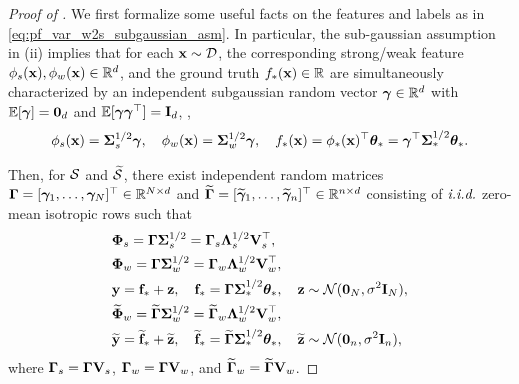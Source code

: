 \begin{proof}[Proof of ]
    We first formalize some useful facts on the features and labels as in \eqref{eq:pf_var_w2s_subgaussian_asm}.
    In particular, the sub-gaussian assumption in (ii) implies that for each $\xb \sim \Dcal$, the corresponding strong/weak feature $\phi_s(\xb), \phi_w(\xb) \in \R^d$, and the ground truth $f_*(\xb) \in \R$ are simultaneously characterized by an independent subgaussian random vector $\gammab \in \R^d$ with $\E[\gammab] = \b0_{d}$ and $\E[\gammab \gammab^\top] = \Ib_{d}$, \ie,
    \begin{align*}
        \phi_s(\xb) = \Sigmab_s^{1/2} \gammab, \quad \phi_w(\xb) = \Sigmab_w^{1/2} \gammab, \quad f_*(\xb) = \phi_*(\xb)^\top \thetab_* = \gammab^\top \Sigmab_*^{1/2} \thetab_*.
    \end{align*}

    Then, for $\Scal$ and $\wt\Scal$, there exist independent random matrices $\Gammab = [\gammab_1, \ldots, \gammab_N]^\top \in \R^{N \times d}$ and $\wt\Gammab = [\wt\gammab_1, \ldots, \wt\gammab_n]^\top \in \R^{n \times d}$ consisting of $\iid$ zero-mean isotropic rows such that
    \begin{align}\label{eq:pf_var_w2s_subgaussian_asm_2}
    \begin{split}
        &\Phib_s = \Gammab \Sigmab_s^{1/2} = \Gammab_s \Lambdab_s^{1/2} \Vb_s^\top, \\
        &\Phib_w = \Gammab \Sigmab_w^{1/2} = \Gammab_w \Lambdab_w^{1/2} \Vb_w^\top, \\
        &\yb = \fb_* + \zb, \quad \fb_* = \Gammab \Sigmab_*^{1/2} \thetab_*, \quad \zb \sim \Ncal(\b0_N, \sigma^2 \Ib_N), \\
        &\wt\Phib_w = \wt\Gammab \Sigmab_w^{1/2} = \wt\Gammab_w \Lambdab_w^{1/2} \Vb_w^\top, \\
        &\wt\yb = \wt\fb_* + \wt\zb, \quad \wt\fb_* = \wt\Gammab \Sigmab_*^{1/2} \thetab_*, \quad \wt\zb \sim \Ncal(\b0_n, \sigma^2 \Ib_n),
    \end{split}
    \end{align}
    where $\Gammab_s = \Gammab \Vb_s$, $\Gammab_w = \Gammab \Vb_w$, and $\wt\Gammab_w = \wt\Gammab \Vb_w$.


\end{proof}

